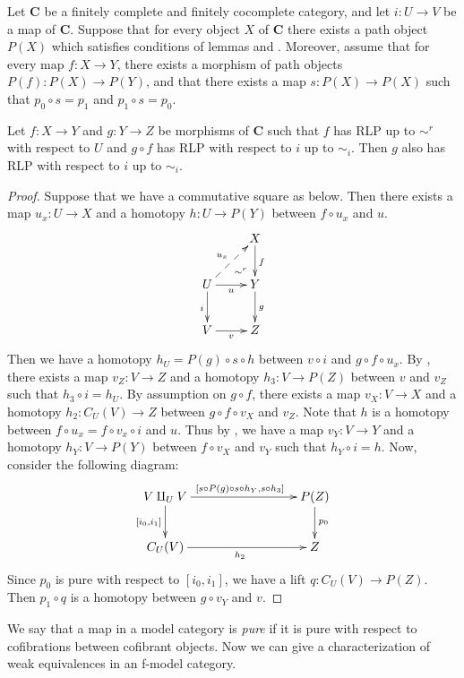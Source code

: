 \documentclass{amsart}
\theoremstyle{definition}
\newcommand{\cat}[1]{\mathbf{#1}}
\newcommand{\C}{\cat{C}}
\newcommand{\cyli}{i}
\begin{document}
\begin{lem}[we-bot]
Let $\C$ be a finitely complete and finitely cocomplete category, and let $i : U \to V$ be a map of $\C$.
Suppose that for every object $X$ of $\C$ there exists a path object $P(X)$ which satisfies conditions of lemmas  and .
Moreover, assume that for every map $f : X \to Y$, there exists a morphism of path objects $P(f) : P(X) \to P(Y)$,
and that there exists a map $s : P(X) \to P(X)$ such that $p_0 \circ s = p_1$ and $p_1 \circ s = p_0$.

Let $f : X \to Y$ and $g : Y \to Z$ be morphisms of $\C$ such that $f$ has RLP up to $\sim^r$ with respect to $U$ and $g \circ f$ has RLP with respect to $i$ up to $\sim_i$.
Then $g$ also has RLP with respect to $i$ up to $\sim_i$.
\end{lem}
\begin{proof}
Suppose that we have a commutative square as below.
Then there exists a map $u_x : U \to X$ and a homotopy $h : U \to P(Y)$ between $f \circ u_x$ and $u$.
\[ \xymatrix{   \ar@{}[dr]|(.7){\sim^r}               & X \ar[d]^f \\
              U \ar@{-->}[ur]^{u_x} \ar[d]_i \ar[r]_u & Y \ar[d]^g \\
              V \ar[r]_v                              & Z
            } \]
Then we have a homotopy $h_U = P(g) \circ s \circ h$ between $v \circ i$ and $g \circ f \circ u_x$.
By , there exists a map $v_Z : V \to Z$ and a homotopy $h_3 : V \to P(Z)$ between $v$ and $v_Z$ such that $h_3 \circ i = h_U$.
By assumption on $g \circ f$, there exists a map $v_X : V \to X$ and a homotopy $h_2 : C_U(V) \to Z$ between $g \circ f \circ v_X$ and $v_Z$.
Note that $h$ is a homotopy between $f \circ u_x = f \circ v_x \circ i$ and $u$.
Thus by , we have a map $v_Y : V \to Y$ and a homotopy $h_Y : V \to P(Y)$ between $f \circ v_X$ and $v_Y$ such that $h_Y \circ i = h$.
Now, consider the following diagram:
\[ \xymatrix{ V \amalg_U V \ar[rrr]^{[s \circ P(g) \circ s \circ h_Y, s \circ h_3]} \ar[d]_{[\cyli_0,\cyli_1]} & & & P(Z) \ar[d]^{p_0} \\
              C_U(V) \ar[rrr]_{h_2} & & & Z
            } \]
Since $p_0$ is pure with respect to $[\cyli_0,\cyli_1]$, we have a lift $q : C_U(V) \to P(Z)$.
Then $p_1 \circ q$ is a homotopy between $g \circ v_Y$ and $v$.
\end{proof}

We say that a map in a model category is \emph{pure} if it is pure with respect to cofibrations between cofibrant objects.
Now we can give a characterization of weak equivalences in an f-model category.
\end{document}
